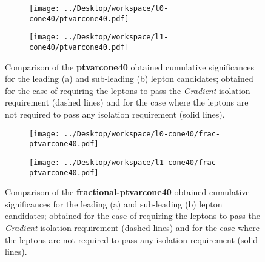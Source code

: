 \begin{figure}
\centering
\begin{subfigure}{.85\textwidth}
  \centering
  \texttt{[image: ../Desktop/workspace/l0-cone40/ptvarcone40.pdf]}
  \caption{}
  \label{leading_ptvarcone}
\end{subfigure}
\begin{subfigure}{.85\textwidth}
  \centering
  \texttt{[image: ../Desktop/workspace/l1-cone40/ptvarcone40.pdf]}
  \caption{}
  \label{subleading_ptvarcone}
\end{subfigure}
\caption{Comparison of the \textbf{ptvarcone40} obtained cumulative significances for the leading (a) and sub-leading (b) lepton candidates; obtained for the case of requiring the leptons to pass the \textit{Gradient} isolation requirement (dashed lines) and for the case where the leptons are not required to pass any isolation requirement (solid lines).}
\label{comp_ptvarcone40}
\end{figure}
\begin{figure}
\centering
\begin{subfigure}{.85\textwidth}
  \centering
  \texttt{[image: ../Desktop/workspace/l0-cone40/frac-ptvarcone40.pdf]}
  \caption{}
  \label{leading_frac-ptvarcone}
\end{subfigure}
\begin{subfigure}{.85\textwidth}
  \centering
  \texttt{[image: ../Desktop/workspace/l1-cone40/frac-ptvarcone40.pdf]}
  \caption{}
  \label{subleading_frac-ptvarcone}
\end{subfigure}
\caption{Comparison of the \textbf{fractional-ptvarcone40} obtained cumulative significances for the leading (a) and sub-leading (b) lepton candidates; obtained for the case of requiring the leptons to pass the \textit{Gradient} isolation requirement (dashed lines) and for the case where the leptons are not required to pass any isolation requirement (solid lines).}
\label{comp_frac-ptvarcone40}
\end{figure}